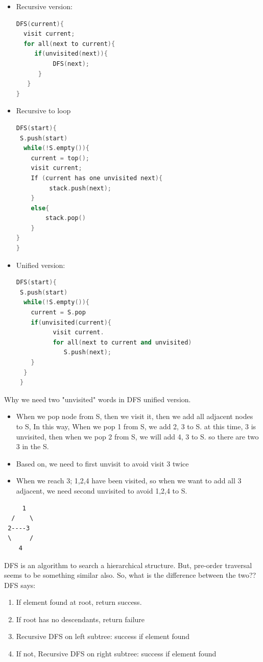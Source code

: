 \documentclass[a4paper,11pt,twoside]{book}
\begin{document}
\begin{itemize}
	
	\item Recursive version:
\begin{lstlisting}[frame=single, language=c++]
DFS(current){
  visit current;
  for all(next to current){
     if(unvisited(next)){
          DFS(next);
      }
   }
}
\end{lstlisting} 

\item Recursive to loop
\begin{lstlisting}[frame=single, language=c++]
DFS(start){
 S.push(start)  
  while(!S.empty()){
    current = top();
    visit current;
    If (current has one unvisited next){ 
         stack.push(next);
    }   
    else{
        stack.pop()
    }
}
}
\end{lstlisting} 

\item Unified version:
\begin{lstlisting}[frame=single, language=c++]
DFS(start){
 S.push(start)  
  while(!S.empty()){
    current = S.pop
    if(unvisited(current){
          visit current.
          for all(next to current and unvisited)
             S.push(next);
    }
  }
 }
\end{lstlisting} 
\end{itemize}

	\par  Why we need two "unvisited" words in DFS unified version.  
\begin{itemize}
\item When we pop node from S, then we visit it, then we add all adjacent nodes to S, In this way, When we pop 1 from S, we add 2, 3 to S. at this time, 3 is unvisited, then when we pop 2 from S, we will add 4, 3 to S. so there are two 3 in the S. 
\item Based on, we need to first unvisit to avoid visit 3 twice

\item When we reach 3; 1,2,4 have been visited, so when we want to add all 3 adjacent, we need second unvisited to avoid 1,2,4 to S.  
\end{itemize}
\begin{verbatim}
     1
  /    \
 2----3
 \     /
    4      
\end{verbatim}

\par DFS is an algorithm to search a hierarchical structure. But, pre-order traversal seems to be something similar also. So, what is the difference between the two?? DFS says:
\begin{enumerate}
\item If element found at root, return success.
\item If root has no descendants, return failure
\item Recursive DFS on left subtree: success if element found
\item If not, Recursive DFS on right subtree: success if element found
\end{enumerate}
\end{document}
